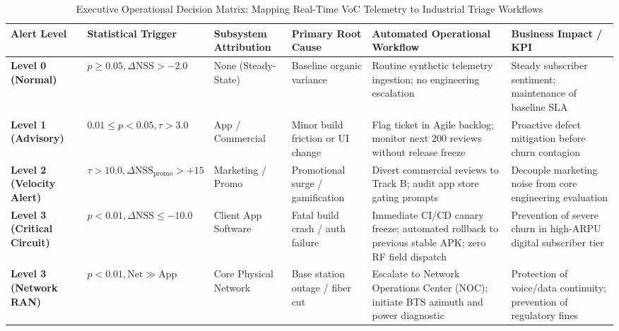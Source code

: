 \documentclass[review,12pt,authoryear]{elsarticle}
\begin{document}
\begin{table}[t]
\centering
\caption{Executive Operational Decision Matrix: Mapping Real-Time VoC Telemetry to Industrial Triage Workflows}
\label{tab:executive_matrix}
\footnotesize
\setlength{\tabcolsep}{6pt}
\begin{tabularx}{\textwidth}{@{}lllllX@{}}
\toprule
Alert Level & Statistical Trigger & Subsystem Attribution & Primary Root Cause & Automated Operational Workflow & Business Impact / KPI \\
\midrule
\textbf{Level 0 (Normal)} & $p \ge 0.05, \Delta\text{NSS} > -2.0$ & None (Steady-State) & Baseline organic variance & Routine synthetic telemetry ingestion; no engineering escalation & Steady subscriber sentiment; maintenance of baseline SLA \\
\addlinespace
\textbf{Level 1 (Advisory)} & $0.01 \le p < 0.05, \tau > 3.0$ & App / Commercial & Minor build friction or UI change & Flag ticket in Agile backlog; monitor next 200 reviews without release freeze & Proactive defect mitigation before churn contagion \\
\addlinespace
\textbf{Level 2 (Velocity Alert)} & $\tau > 10.0, \Delta\text{NSS}_{\text{promo}} > +15$ & Marketing / Promo & Promotional surge / gamification & Divert commercial reviews to Track B; audit app store gating prompts & Decouple marketing noise from core engineering evaluation \\
\addlinespace
\textbf{Level 3 (Critical Circuit)} & $p < 0.01, \Delta\text{NSS} \le -10.0$ & Client App Software & Fatal build crash / auth failure & Immediate CI/CD canary freeze; automated rollback to previous stable APK; zero RF field dispatch & Prevention of severe churn in high-ARPU digital subscriber tier \\
\addlinespace
\textbf{Level 3 (Network RAN)} & $p < 0.01, \text{Net} \gg \text{App}$ & Core Physical Network & Base station outage / fiber cut & Escalate to Network Operations Center (NOC); initiate BTS azimuth and power diagnostic & Protection of voice/data continuity; prevention of regulatory fines \\
\bottomrule
\end{tabularx}
\end{table}

\end{document}
